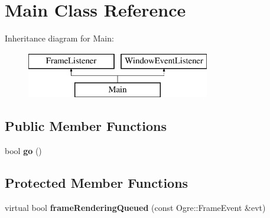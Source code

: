 \hypertarget{class_main}{}\section{Main Class Reference}
\label{class_main}
Inheritance diagram for Main\+:\begin{figure}[H]
\begin{center}
\leavevmode
\includegraphics[height=2.000000cm]{class_main}
\end{center}
\end{figure}
\subsection*{Public Member Functions}
\begin{DoxyCompactItemize}
\item 
\hypertarget{class_main_a24eca335d9f64d276e5d42e36fbbe26e}{}bool {\bfseries go} ()\label{class_main_a24eca335d9f64d276e5d42e36fbbe26e}

\end{DoxyCompactItemize}
\subsection*{Protected Member Functions}
\begin{DoxyCompactItemize}
\item 
\hypertarget{class_main_a5f6baea1ccb9bc00f67c7e5c4a26b5af}{}virtual bool {\bfseries frame\+Rendering\+Queued} (const Ogre\+::\+Frame\+Event \&evt)\label{class_main_a5f6baea1ccb9bc00f67c7e5c4a26b5af}

\end{DoxyCompactItemize}
